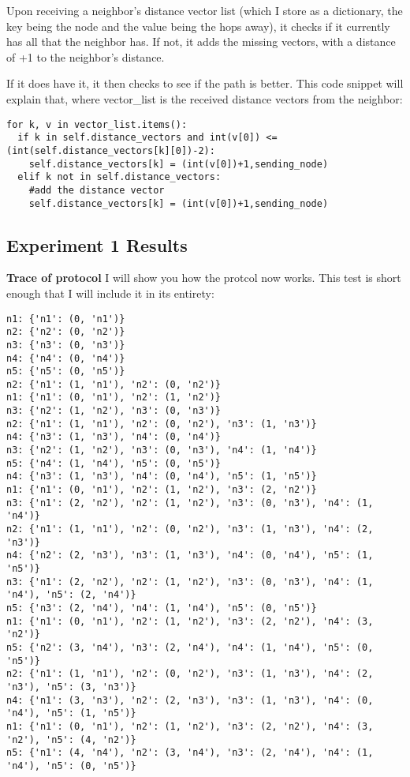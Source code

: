 \documentclass[fleqn,11pt]{article}
\begin{document}
Upon receiving a neighbor's distance vector list (which I store as a dictionary, the key being the node and the value being the hops away), it checks if it currently has all that the neighbor has. If not, it adds the missing vectors, with a distance of +1 to the neighbor's distance.

If it does have it, it then checks to see if the path is better. This code snippet will explain that, where vector_list is the received distance vectors from the neighbor:

\begin{lstlisting}
for k, v in vector_list.items():
  if k in self.distance_vectors and int(v[0]) <= (int(self.distance_vectors[k][0])-2):
    self.distance_vectors[k] = (int(v[0])+1,sending_node)
  elif k not in self.distance_vectors:
    #add the distance vector
    self.distance_vectors[k] = (int(v[0])+1,sending_node)
\end{lstlisting}

\subsection{Experiment 1 Results}
\textbf{Trace of protocol}
I will show you how the protcol now works. This test is short enough that I will include it in its entirety:
\begin{lstlisting}
n1: {'n1': (0, 'n1')}
n2: {'n2': (0, 'n2')}
n3: {'n3': (0, 'n3')}
n4: {'n4': (0, 'n4')}
n5: {'n5': (0, 'n5')}
n2: {'n1': (1, 'n1'), 'n2': (0, 'n2')}
n1: {'n1': (0, 'n1'), 'n2': (1, 'n2')}
n3: {'n2': (1, 'n2'), 'n3': (0, 'n3')}
n2: {'n1': (1, 'n1'), 'n2': (0, 'n2'), 'n3': (1, 'n3')}
n4: {'n3': (1, 'n3'), 'n4': (0, 'n4')}
n3: {'n2': (1, 'n2'), 'n3': (0, 'n3'), 'n4': (1, 'n4')}
n5: {'n4': (1, 'n4'), 'n5': (0, 'n5')}
n4: {'n3': (1, 'n3'), 'n4': (0, 'n4'), 'n5': (1, 'n5')}
n1: {'n1': (0, 'n1'), 'n2': (1, 'n2'), 'n3': (2, 'n2')}
n3: {'n1': (2, 'n2'), 'n2': (1, 'n2'), 'n3': (0, 'n3'), 'n4': (1, 'n4')}
n2: {'n1': (1, 'n1'), 'n2': (0, 'n2'), 'n3': (1, 'n3'), 'n4': (2, 'n3')}
n4: {'n2': (2, 'n3'), 'n3': (1, 'n3'), 'n4': (0, 'n4'), 'n5': (1, 'n5')}
n3: {'n1': (2, 'n2'), 'n2': (1, 'n2'), 'n3': (0, 'n3'), 'n4': (1, 'n4'), 'n5': (2, 'n4')}
n5: {'n3': (2, 'n4'), 'n4': (1, 'n4'), 'n5': (0, 'n5')}
n1: {'n1': (0, 'n1'), 'n2': (1, 'n2'), 'n3': (2, 'n2'), 'n4': (3, 'n2')}
n5: {'n2': (3, 'n4'), 'n3': (2, 'n4'), 'n4': (1, 'n4'), 'n5': (0, 'n5')}
n2: {'n1': (1, 'n1'), 'n2': (0, 'n2'), 'n3': (1, 'n3'), 'n4': (2, 'n3'), 'n5': (3, 'n3')}
n4: {'n1': (3, 'n3'), 'n2': (2, 'n3'), 'n3': (1, 'n3'), 'n4': (0, 'n4'), 'n5': (1, 'n5')}
n1: {'n1': (0, 'n1'), 'n2': (1, 'n2'), 'n3': (2, 'n2'), 'n4': (3, 'n2'), 'n5': (4, 'n2')}
n5: {'n1': (4, 'n4'), 'n2': (3, 'n4'), 'n3': (2, 'n4'), 'n4': (1, 'n4'), 'n5': (0, 'n5')}
\end{lstlisting}
\end{document}
